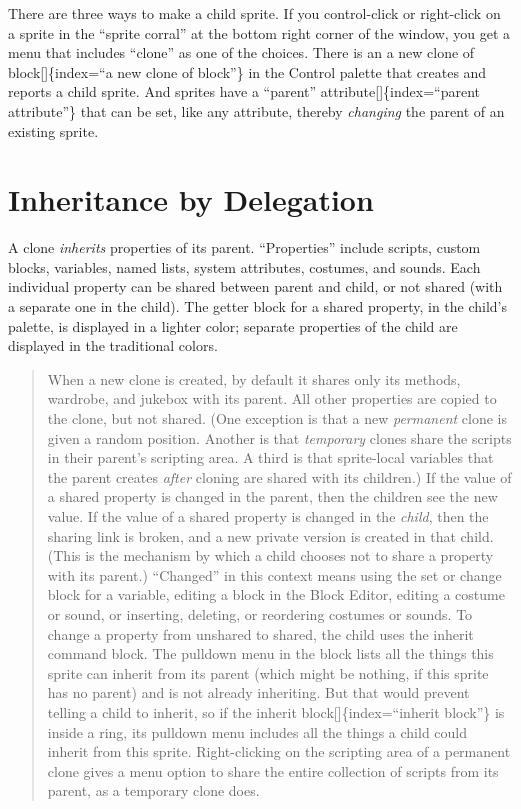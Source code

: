 \documentclass[
  letterpaper,
]{book}
\begin{document}
There are three ways to make a child sprite. If you control-click or
right-click on a sprite in the ``sprite corral'' at the bottom right
corner of the window, you get a menu that includes ``clone'' as one of
the choices. There is an a new clone of block{[}{]}\{index=``a new clone
of block''\} in the Control palette that creates and reports a child
sprite. And sprites have a ``parent'' attribute{[}{]}\{index=``parent
attribute''\} that can be set, like any attribute, thereby
\emph{changing} the parent of an existing sprite.

\section{Inheritance by Delegation}\label{inheritance-by-delegation}

A clone \emph{inherits} properties of its parent. ``Properties'' include
scripts, custom blocks, variables, named lists, system attributes,
costumes, and sounds. Each individual property can be shared between
parent and child, or not shared (with a separate one in the child). The
getter block for a shared property, in the child's palette, is displayed
in a lighter color; separate properties of the child are displayed in
the traditional colors.

\begin{quote}
When a new clone is created, by default it shares only its methods,
wardrobe, and jukebox with its parent. All other properties are copied
to the clone, but not shared. (One exception is that a new
\emph{permanent} clone is given a random position. Another is that
\emph{temporary} clones share the scripts in their parent's scripting
area. A third is that sprite-local variables that the parent creates
\emph{after} cloning are shared with its children.) If the value of a
shared property is changed in the parent, then the children see the new
value. If the value of a shared property is changed in the \emph{child},
then the sharing link is broken, and a new private version is created in
that child. (This is the mechanism by which a child chooses not to share
a property with its parent.) ``Changed'' in this context means using the
set or change block for a variable, editing a block in the Block Editor,
editing a costume or sound, or inserting, deleting, or reordering
costumes or sounds. To change a property from unshared to shared, the
child uses the inherit command block. The pulldown menu in the block
lists all the things this sprite can inherit from its parent (which
might be nothing, if this sprite has no parent) and is not already
inheriting. But that would prevent telling a child to inherit, so if the
inherit block{[}{]}\{index=``inherit block''\} is inside a ring, its
pulldown menu includes all the things a child could inherit from this
sprite. Right-clicking on the scripting area of a permanent clone gives
a menu option to share the entire collection of scripts from its parent,
as a temporary clone does.
\end{quote}
\end{document}
